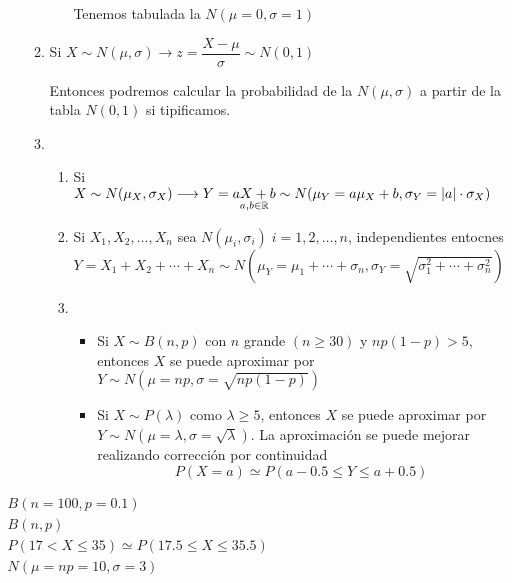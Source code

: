 \begin{enumerate}[label=\textbf{\color{red}\Alph*)}, leftmargin=*]
\begin{enumerate}[label=\color{red}\alph*)]
\begin{itemize}
				Tenemos tabulada la $N(\mu=0,\sigma=1)$
			\end{itemize}
			\item {} Si $X\sim N(\mu,\sigma)\longrightarrow z=\dfrac{X-\mu}{\sigma}\sim N(0,1)$
			
			Entonces podremos calcular la probabilidad de la $N(\mu,\sigma)$ a partir de la tabla $N(0,1)$ si tipificamos.
			\item {}
			\begin{enumerate}[label=\color{lightblue}\arabic*)]
				\item Si $X\sim N(\mu_X,\sigma_X)\longrightarrow Y=\underset{a,b\in\operatorname{\mathbb{R}}}{aX+b}\sim N(\mu_Y=a\mu_X+b,\sigma_Y=|a|\cdot\sigma_X)$
				\item Si $X_1,X_2,\dots,X_n$ sea $N(\mu_i,\sigma_i)\;i=1,2,\dots,n$, independientes entocnes $Y=X_1+X_2+\cdots+X_n\sim N(\mu_Y=\mu_1+\cdots+\sigma_n,\sigma_Y=\sqrt{\sigma_1^2+\cdots+\sigma_n^2})$
				\item \begin{itemize}
					\item Si $X\sim B(n,p)$ con $n$ grande $(n\ge30)$ y $np(1-p)>5$, entonces $X$ se puede aproximar por $Y\sim N(\mu=np,\sigma=\sqrt{np(1-p)})$
					\item Si $X\sim P(\lambda)$ como $\lambda\ge5$, entonces $X$ se puede aproximar por $Y\sim N(\mu=\lambda,\sigma=\sqrt{\lambda})$. La aproximación se puede mejorar realizando corrección por continuidad \[ P(X=a)\simeq P(a-0.5\le Y\le a+0.5) \]
					
				\end{itemize}
			\end{enumerate}
		\end{enumerate}
\end{enumerate}
\begin{minipage}[l]{0.3\textwidth}
\end{minipage}\qquad$\begin{array}{l}
B(n=100,p=0.1)\\
B(n,p)\\
P(17<X\le35)\simeq P(17.5\le X\le 35.5)\\
N(\mu=np=10,\sigma=3)
\end{array}$

